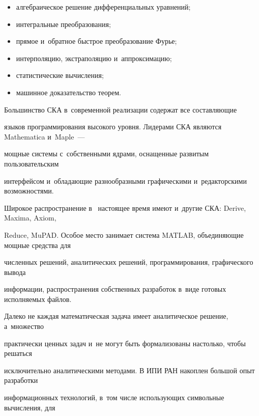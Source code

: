 \begin{itemize}
\item     алгебраическое решение дифференциальных уравнений;



\item     интегральные преобразования;



\item     прямое и~обратное быстрое преобразование Фурье;



\item     интерполяцию, экстраполяцию и~аппроксимацию;



\item     статистические вычисления;



\item     машинное доказательство теорем.

\end{itemize}



Большинство СКА в~современной реализации содержат все составляющие 

языков программирования высокого уровня. Лидерами СКА являются Mathematica и~Maple~--- 

мощные системы с~собственными  ядрами, оснащенные  развитым  пользовательским 

интерфейсом и~обладающие разнообразными графическими и~редакторскими  возможностями. 

Широкое распространение в~ настоящее время имеют и~другие СКА: Derive,  Maxima, Axiom, 

Reduce, MuPAD. Особое место занимает система MATLAB, объединяющие мощные средства для 

численных решений, аналитических решений, программирования, графического вывода 

информации, распространения собственных разработок в~виде готовых исполняемых файлов.



Далеко не каждая математическая задача имеет аналитическое решение, а~множество 

практически ценных задач и~не могут быть формализованы настолько, чтобы решаться 

исключительно аналитическими методами. В ИПИ РАН накоплен большой опыт разработки 

информационных технологий, в~том числе использующих символьные вычисления, для 

